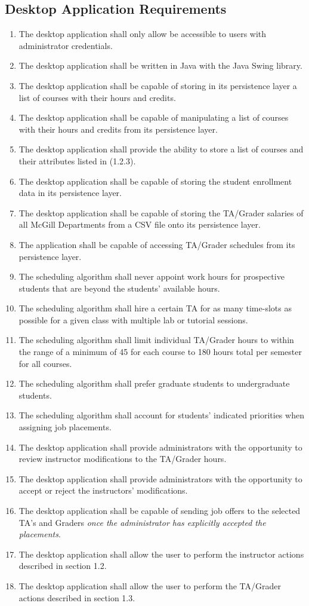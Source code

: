 \documentclass[12pt,openany]{report}
\begin{document}
\subsection{Desktop Application Requirements}
\begin{enumerate}[\thesubsection .1]
	\item The desktop application shall only allow be accessible to users with administrator credentials.
	\item The desktop application shall be written in Java with the Java Swing library.
	\item The desktop application shall be capable of storing in its persistence layer a list of courses with their hours and credits.
	\item The desktop application shall be capable of manipulating a list of courses with their hours and credits from its persistence layer.
	\item The desktop application shall provide the ability to store a list of courses and their attributes listed in (1.2.3).
	\item The desktop application shall be capable of storing the student enrollment data in its persistence layer.
    \item  The desktop application shall be capable of storing the TA/Grader salaries of all McGill Departments from a CSV file onto its persistence layer.
	\item The application shall be capable of accessing TA/Grader schedules from its persistence layer.
	\item The scheduling algorithm shall never appoint work hours for prospective students that are beyond the students' available hours.
	\item The scheduling algorithm shall hire a certain TA for as many time-slots as possible for a given class with multiple lab or tutorial sessions.
	\item The scheduling algorithm shall limit individual TA/Grader hours to within the range of  a minimum of 45 for each course to 180 hours total per semester for all courses.
	\item The scheduling algorithm shall prefer graduate students to undergraduate students.
	\item The scheduling algorithm shall account for students' indicated priorities when assigning job placements.
	\item The desktop application shall provide administrators with the opportunity to review instructor modifications to the TA/Grader hours.
	\item The desktop application shall provide administrators with the opportunity to accept or reject the instructors' modifications.
	\item The desktop application shall be capable of sending job offers to the selected TA's and Graders \textit{once the administrator has explicitly accepted the placements}.
	\item The desktop application shall allow the user to perform the instructor actions described in section 1.2.
	\item The desktop application shall allow the user to perform the TA/Grader actions described in section 1.3.
\end{enumerate}
\end{document}
